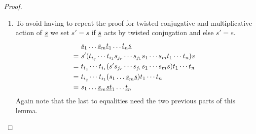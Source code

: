 \begin{lemm}
\begin{proof}
\begin{enumerate}
			\item To avoid having to repeat the proof for twisted conjugative and multiplicative action of $\underline{s}$ we set $s' = s$ if $\underline{s}$ acts by twisted conjugation and else $s' = e$.
			\begin{align*}
					& \ul s_1 \ldots \ul s_m \ul t_1 \ldots \ul t_n \ul s \\
				= \	& s' (t_{i_q} \cdots t_{i_1} s_{j_r} \cdots s_{j_1} s_1 \cdots s_m t_1 \cdots t_n) s \\
				= \	& t_{i_q} \cdots t_{i_1} (s' s_{j_r} \cdots s_{j_1} s_1 \cdots s_m s) t_1 \cdots t_n \\
				= \	& t_{i_q} \cdots t_{i_1} (s_1 \ldots \ul s_m \ul s) t_1 \cdots t_n \\
				= \	& s_1 \ldots \ul s_m \ul s \ul t_1 \ldots \ul t_n
			\end{align*}
			Again note that the last to equalities need the two previous parts of this lemma. \qedhere
		\end{enumerate}
	\end{proof}
\end{lemm}

